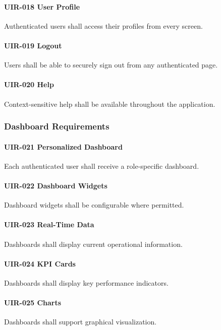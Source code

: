 \paragraph{UIR-018 User Profile}
Authenticated users shall access their profiles from every screen.

\paragraph{UIR-019 Logout}
Users shall be able to securely sign out from any authenticated page.

\paragraph{UIR-020 Help}
Context-sensitive help shall be available throughout the application.


\subsubsection*{Dashboard Requirements}

\paragraph{UIR-021 Personalized Dashboard}
Each authenticated user shall receive a role-specific dashboard.

\paragraph{UIR-022 Dashboard Widgets}
Dashboard widgets shall be configurable where permitted.

\paragraph{UIR-023 Real-Time Data}
Dashboards shall display current operational information.

\paragraph{UIR-024 KPI Cards}
Dashboards shall display key performance indicators.

\paragraph{UIR-025 Charts}
Dashboards shall support graphical visualization.

